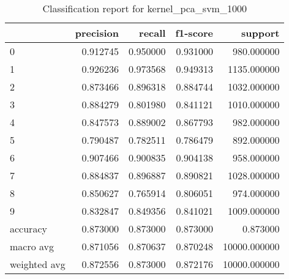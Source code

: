 \begin{table}[htb!]
\centering
\caption{Classification report for kernel_pca_svm_1000}
\label{tab:classification-report-kernel_pca_svm_1000}
\begin{tabular}{lrrrr}
\toprule
 & precision & recall & f1-score & support \\
\midrule
0 & 0.912745 & 0.950000 & 0.931000 & 980.000000 \\
1 & 0.926236 & 0.973568 & 0.949313 & 1135.000000 \\
2 & 0.873466 & 0.896318 & 0.884744 & 1032.000000 \\
3 & 0.884279 & 0.801980 & 0.841121 & 1010.000000 \\
4 & 0.847573 & 0.889002 & 0.867793 & 982.000000 \\
5 & 0.790487 & 0.782511 & 0.786479 & 892.000000 \\
6 & 0.907466 & 0.900835 & 0.904138 & 958.000000 \\
7 & 0.884837 & 0.896887 & 0.890821 & 1028.000000 \\
8 & 0.850627 & 0.765914 & 0.806051 & 974.000000 \\
9 & 0.832847 & 0.849356 & 0.841021 & 1009.000000 \\
accuracy & 0.873000 & 0.873000 & 0.873000 & 0.873000 \\
macro avg & 0.871056 & 0.870637 & 0.870248 & 10000.000000 \\
weighted avg & 0.872556 & 0.873000 & 0.872176 & 10000.000000 \\
\bottomrule
\end{tabular}
\end{table}
